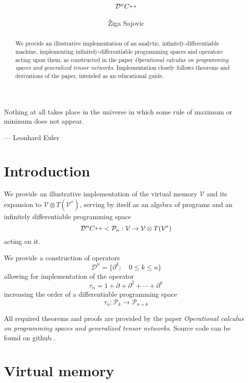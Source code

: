 \documentclass{article}
\title{$\DD^n\CC$}
\author{Žiga Sajovic}
\newcommand{\VV}{\mathcal{V}}
\newcommand{\CC}{C\nolinebreak\hspace{-.05em}\raisebox{.4ex}{\tiny\bf +}\nolinebreak\hspace{-.10em}\raisebox{.4ex}{\tiny\bf +}}
\def\CC{{C\nolinebreak[4]\hspace{-.05em}\raisebox{.4ex}{\tiny\bf ++}}}
\newcommand{\dP}{\mathcal{P}}
\newcommand{\D}{\partial}
\newcommand{\DD}{\mathcal{D}}
\newcommand{\sumd}{\tau}
\begin{document}
\maketitle

\begin{abstract}
We provide an illustrative implementation of an analytic, infinitely-differentiable machine, implementing infinitely-differentiable programming spaces and operators acting upon them, as constructed in the paper \emph{Operational calculus on programming spaces and generalized tensor networks}. Implementation closely follows theorems and derivations of the paper, intended as an educational guide.
\end{abstract}

\epigraph{Nothing at all takes place in the universe in which some rule of maximum or minimum does not appear.}{--- \textup{Leonhard Euler}}

\tableofcontents

\section{Introduction}

We provide an illustrative implementation of the virtual memory $\VV$ and its expansion to $\VV\otimes T(\VV^*)$, serving by itself as an algebra of programs and an infinitely differentiable programming space
\begin{equation}
\DD^n\CC<\dP_n:\VV\to\VV\otimes T(\VV^*)
\end{equation}
acting on it.

We provide a construction of operators
\begin{equation}
\DD^n=\{\D^k;\quad 0\le k\le n\}
\end{equation}
allowing for implementation of the operator
\begin{equation}\label{eq:sumd}
\sumd_n=1+\D+\D^2+\cdots+\D^n
\end{equation}
increasing the order of a differentiable programming space
\begin{equation}
\sumd_n:\dP_k\to\dP_{n+k}
\end{equation}

All required theorems and proofs are provided by the paper \emph{Operational calculus on programming spaces and generalized tensor networks}. Source code can be found on github \cite{dCpp}.

\section{Virtual memory}
\end{document}
